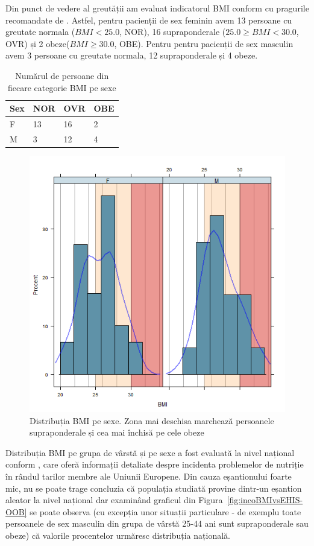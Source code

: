 \documentclass[12pt]{article}
\begin{document}
  Din punct de vedere al greutății am evaluat indicatorul \ac{BMI} conform cu pragurile recomandate de \citep{whobmi06}. 
  Astfel, pentru pacienții de sex feminin avem 13 persoane cu greutate normala ($BMI<25.0$, NOR), 16 supraponderale ($25.0 \geq BMI <30.0$, OVR) și 2 obeze($BMI \geq 30.0$, OBE). 
  Pentru pentru pacienții de sex masculin avem 3 persoane cu greutate normala, 12 supraponderale și 4 obeze.   
  \begin{table}[H]
   \centering
   \begin{tabular}{ |l|l|l|l| }
    \hline
    Sex & NOR & OVR & OBE \\ \hline
    F & 13 & 16 & 2 \\ \hline
    M & 3 &  12 & 4 \\ \hline
   \end{tabular}
   \caption{Numărul de persoane din fiecare categorie \ac{BMI} pe sexe}
   \label{tab:BMIgSex}
  \end{table}
  \begin{figure}[H]
    \centering
    \includegraphics[width=0.8\linewidth]{incobmiDens}
    \caption{Distribuția \ac{BMI} pe sexe. Zona mai deschisa marchează persoanele supraponderale și cea mai închisă pe cele obeze}
    \label{fig:incobmiDens}
  \end{figure}
  Distribuția \ac{BMI} pe grupa de vârstă și pe sexe a fost evaluată la nivel național conform \citep{EHIS09}, care oferă informații detaliate despre incidenta problemelor de nutriție în rândul tarilor membre ale Uniunii Europene. 
  Din cauza eșantionului foarte mic, nu se poate trage concluzia că populația studiată provine dintr-un eșantion aleator la nivel național dar examinând graficul din Figura~\ref{fig:incoBMIvsEHIS-OOB} se poate observa (cu excepția unor situații particulare - de exemplu toate persoanele de sex masculin din grupa de vârstă 25-44 ani sunt supraponderale sau obeze) că valorile procentelor urmăresc distribuția națională.
\end{document}
